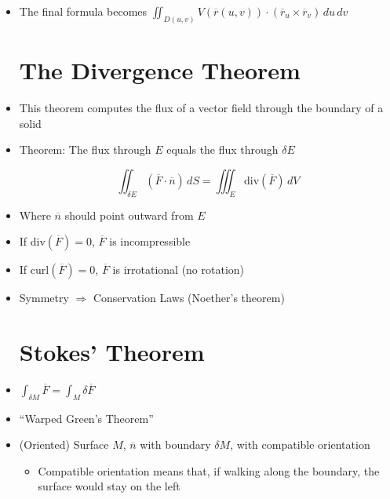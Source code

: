 \begin{itemize}
\begin{itemize}
    \end{itemize}

  \item The final formula becomes $\displaystyle \iint_{D(u,v)} V(\overline{r}(u,v))\cdot (\overline{r}_u\times\overline{r}_v)\,du\,dv$

    \section{The Divergence Theorem}

  \item This theorem computes the flux of a vector field through the boundary of a solid

  \item Theorem: The flux through $E$ equals the flux through $\delta E$

    $$\iint_{\delta E} (\overline{F}\cdot\overline{n})\,dS=\iiint_E \text{div}(\overline{F})\,dV$$

  \item Where $\overline{n}$ should point outward from $E$

  \item If div$(\overline{F})=0$, $\overline{F}$ is incompressible

  \item If curl$(\overline{F})=0$, $\overline{F}$ is irrotational (no rotation)

  \item Symmetry $\Rightarrow$ Conservation Laws (Noether's theorem)

    \section{Stokes' Theorem}

  \item $\displaystyle \int_{\delta M} \overline{F} = \int_M \delta \overline{F}$
    
  \item ``Warped Green's Theorem''

  \item (Oriented) Surface $M$, $\overline{n}$ with boundary $\delta M$, with compatible orientation

    \begin{itemize}

      \item Compatible orientation means that, if walking along the boundary, the surface would stay on the left


\end{itemize}
\end{itemize}
